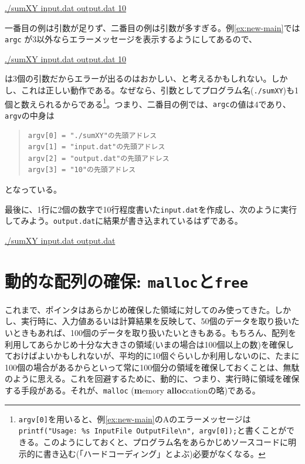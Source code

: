 \begin{commandline2}
\prompt \underline{./sumXY input.dat output.dat 10}
\end{commandline2} \noindent
一番目の例は引数が足りず、二番目の例は引数が多すぎる。例\ref{ex:new-main}では \verb|argc| が3以外ならエラーメッセージを表示するようにしてあるので、
\begin{commandline2}
\prompt \underline{./sumXY input.dat output.dat 10}
\end{commandline2} \noindent
は3個の引数だからエラーが出るのはおかしい、と考えるかもしれない。しかし、これは正しい動作である。なぜなら、引数としてプログラム名(\verb|./sumXY|)も1個と数えられるからである\footnote{{\tt argv[0]}を用いると、例\ref{ex:new-main}のAのエラーメッセージは {\tt printf("Usage: \%s InputFile OutputFile\textbackslash n", argv[0]);}と書くことができる。このようにしておくと、プログラム名をあらかじめソースコードに明示的に書き込む(「ハードコーディング」とよぶ)必要がなくなる。}。つまり、二番目の例では、{\tt argc}の値は4であり、{\tt argv}の中身は
\begin{quote}
\begin{verbatim}
argv[0] = "./sumXY"の先頭アドレス
argv[1] = "input.dat"の先頭アドレス
argv[2] = "output.dat"の先頭アドレス
argv[3] = "10"の先頭アドレス
\end{verbatim}
\end{quote}
となっている。

最後に、1行に2個の数字で10行程度書いた{\tt input.dat}を作成し、次のように実行してみよう。{\tt output.dat}に結果が書き込まれているはずである。
\begin{commandline2}
\prompt \underline{./sumXY input.dat output.dat}
\end{commandline2}

\section{動的な配列の確保: {\tt malloc}と{\tt free}}
\label{sec:clang:malloc}

これまで、ポインタはあらかじめ確保した領域に対してのみ使ってきた。しかし、実行時に、入力値あるいは計算結果を反映して、50個のデータを取り扱いたいときもあれば、100個のデータを取り扱いたいときもある。もちろん、配列を利用してあらかじめ十分な大きさの領域(いまの場合は100個以上の数)を確保しておけばよいかもしれないが、平均的に10個ぐらいしか利用しないのに、たまに100個の場合があるからといって常に100個分の領域を確保しておくことは、無駄のように思える。これを回避するために、動的に、つまり、実行時に領域を確保する手段がある。それが、\verb|malloc| ({\bf m}emory {\bf alloc}cationの略)である。


